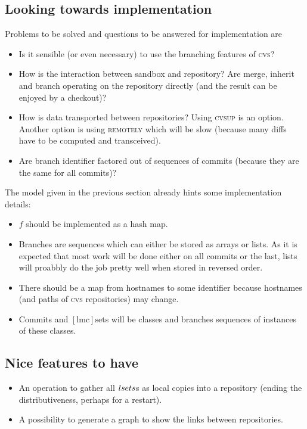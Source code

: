 \documentclass[fleqn, german, 10pt, a4paper]{article}
\begin{document}
\subsection{Looking towards implementation}

Problems to be solved and questions to be answered for implementation
are

\begin{itemize}
\item Is it sensible (or even necessary) to use the branching features
of \textsc{cvs}?
\item How is the interaction between sandbox and repository? Are merge,
inherit and branch operating on the repository directly (and the result
can be enjoyed by a checkout)?
\item How is data transported between repositories? Using \textsc{cvsup}
is an option. Another option is using \textsc{remotely} which will be
slow (because many diffs have to be computed and transceived).
\item Are branch identifier factored out of sequences of commits (because
they are the same for all commits)?
\end{itemize}

The model given in the previous section already hints some implementation
details:

\begin{itemize}
\item $f$ should be implemented as a hash map.
\item Branches are sequences which can either be stored as
arrays or lists. As it is expected that most work will be done
either on all commits or the last, lists will proabbly do the job
pretty well when stored in reversed order.
\item There should be a map from hostnames to some identifier because
hostnames (and paths of \textsc{cvs} repositories) may change.
\item Commits and $\mathrm{[lmc]set}$s will be classes and
branches sequences of instances of these classes.
\end{itemize}

\subsection{Nice features to have}

\begin{itemize}
\item An operation to gather all $\mathnormal{lsets}$s as
local copies into a repository (ending the distributiveness, perhaps
for a restart).
\item A possibility to generate a graph to show the links between
repositories.
\end{itemize}
\end{document}

